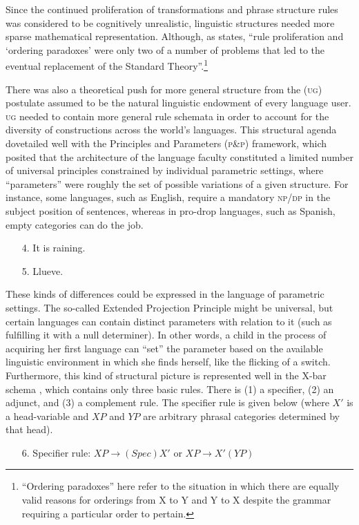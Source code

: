 \documentclass[output=paper]{langscibook}
\begin{document}
Since the continued proliferation of transformations and phrase structure rules was considered to be cognitively unrealistic, linguistic structures needed more sparse mathematical representation. Although, as \cite[24]{Bickerton2014} states, ``rule proliferation and `ordering paradoxes' were only two of a number of problems that led to the eventual replacement of the Standard Theory''.\footnote{``Ordering paradoxes'' here refer to the situation in which there are equally valid reasons for orderings from X to Y and Y to X despite the grammar requiring a particular order to pertain.}

There was also a theoretical push for more general structure from the  (\textsc{ug}) postulate assumed to be the natural linguistic endowment of every language user. \textsc{ug} needed to contain more general rule schemata in order to account for the diversity of constructions across the world's languages. This structural agenda dovetailed well with the Principles and Parameters (\textsc{p\&p}) framework, which posited that the architecture of the language faculty constituted a limited number of universal principles constrained by individual parametric settings, where ``parameters'' were roughly the set of possible variations of a given structure. For instance, some languages, such as English, require a mandatory \textsc{np}/\textsc{dp} in the subject position of sentences, whereas in pro-drop languages, such as Spanish, empty categories can do the job. 

\begin{enumerate}
    \item[4.] It is raining.
    \item[5.] Llueve.
\end{enumerate}

These kinds of differences could be expressed in the language of parametric settings. The so-called Extended Projection Principle might be universal, but certain languages can contain distinct parameters with relation to it (such as fulfilling it with a null determiner). In other words, a child in the process of acquiring her first language can ``set'' the parameter based on the available linguistic environment in which she finds herself, like the flicking of a switch. Furthermore, this kind of structural picture is represented well in the X-bar schema \citep{Jackendoff1977}, which contains only three basic rules. There is (1) a specifier, (2) an adjunct, and (3) a complement rule. The specifier rule is given below (where $X'$ is a head-variable and $XP$ and $YP$ are arbitrary phrasal categories determined by that head).
\begin{itemize}
\item[6.] Specifier rule: $XP\rightarrow (Spec)X'$ or $XP\rightarrow X'(YP)$
\end{itemize}
\end{document}
